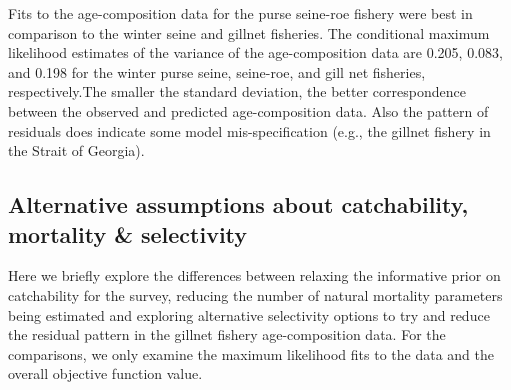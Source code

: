 Fits to the age-composition data for the purse seine-roe fishery were best in comparison to the winter seine and gillnet fisheries.   The conditional maximum likelihood estimates of the variance of the age-composition data are 0.205, 0.083, and 0.198 for the winter purse seine, seine-roe, and gill net fisheries, respectively.The smaller the standard deviation, the better correspondence between the observed and predicted age-composition data.  Also the pattern of residuals does indicate some model mis-specification (e.g., the gillnet fishery in the Strait of Georgia).






	\subsection{Alternative assumptions about catchability, mortality \& selectivity}
	
	Here we briefly explore the differences between relaxing the informative prior on catchability for the survey, reducing the number of natural mortality parameters being estimated and exploring alternative selectivity options to try and reduce the residual pattern in the gillnet fishery age-composition data.  For the comparisons, we only examine the maximum likelihood fits to the data and the overall objective function value.
	
